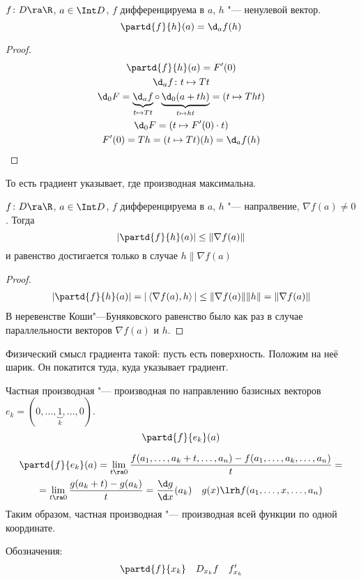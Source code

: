 \begin{assertion}
	$f\colon D \ra \R$, $a \in \Int D$, $f$ дифференцируема в $a$, $h$ "--- ненулевой вектор.
	\[ \partd{f}{h}(a) = \d_a f(h) \]
\end{assertion}
\begin{proof}
	\begin{gather*}
		\partd{f}{h}(a) = F'(0) \\
		\d_a f\colon t \mapsto Tt \\
		\d_0 F = \underbrace{\d_a f}_{t \mapsto Tt} \circ \underbrace{\d_0 (a + th)}_{t \mapsto ht} = (t \mapsto Tht) \\
		\d_0 F = (t \mapsto F'(0) \cdot t) \\
		F'(0) = Th = (t \mapsto Tt)(h) = \d_a f(h)
	\end{gather*}
\end{proof}
То есть градиент указывает, где производная максимальна.
\begin{theorem}
	$f\colon D \ra \R$, $a \in \Int D$, $f$ дифференцируема в $a$, $h$ "--- напралвение, $\nabla f(a) \ne 0$.
	Тогда
	\[ \left|\partd{f}{h}(a)\right| \le \|\nabla f(a) \| \]
	и равенство достигается только в случае $h \parallel \nabla f(a)$
\end{theorem}
\begin{proof}
	\begin{gather*}
		\left|\partd{f}{h}(a)\right| = |\left< \nabla f(a), h\right>| \le \|\nabla f(a)\| \|h\| = \|\nabla f(a) \|
	\end{gather*}
	В неревенстве Коши"---Буняковского равенство было как раз в случае параллельности векторов $\nabla f(a)$ и $h$.
\end{proof}

Физический смысл градиента такой: пусть есть поверхность. Положим на неё шарик. Он покатится туда, куда указывает градиент.

\begin{Def}
	Частная производная "--- производная по направлению базисных векторов $e_k = (0, \dots, \underbrace{1}_{k}, \dots, 0)$.
	\[ \partd{f}{e_k} (a) \]
\end{Def}
\begin{Rem}
	\begin{gather*}
		\partd{f}{e_k} (a) = \lim_{t \ra 0} \frac{f(a_1, \dots, a_k + t, \dots, a_n) - f(a_1, \dots, a_k, \dots, a_n)}t = \\
		= \lim_{t \ra 0} \frac{g(a_k + t) - g(a_k)}t = \frac{\d g}{\d x} (a_k) \quad g(x) \lrh f(a_1, \dots, x, \dots, a_n)
	\end{gather*}
	Таким образом, частная производная "--- производная всей функции по одной координате.
\end{Rem}
Обозначения:
\[
	\begin{matrix}
		\partd{f}{x_k} & D_{x_k} f & f'_{x_k}
	\end{matrix}
\]


